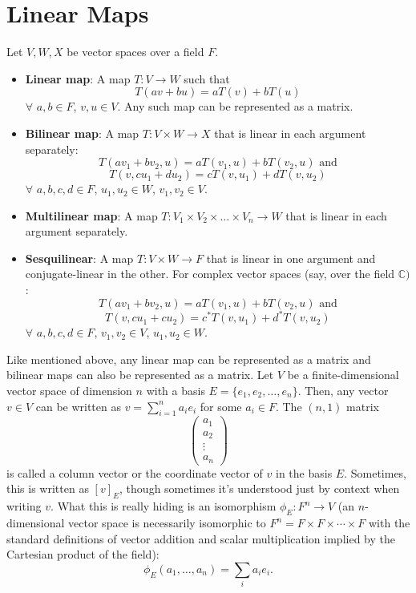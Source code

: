 \section{Linear Maps}
Let $V, W, X$ be vector spaces over a field $F$.
\begin{itemize}
    \item \textbf{Linear map}: A map $T: V\rightarrow W$ such that 
    \[
        T(av + bu) = aT(v) + bT(u)
    \]
    $\forall$ $a, b\in F$, $v, u\in V$. Any such map can be represented as a matrix.
    \item \textbf{Bilinear map}: A map $T: V\times W\rightarrow X$ that is linear in each argument separately:
    \[
        T(av_1 + bv_2, u) = aT(v_1, u) + bT(v_2, u) \text{ and}
    \]
    \[
        T(v, cu_1+du_2) = cT(v, u_1) + dT(v, u_2)
    \]
    $\forall$ $a, b, c, d\in F$, $u_1, u_2\in W$, $v_1, v_2\in V$.
    \item\textbf{Multilinear map}: A map $T: V_1\times V_2\times \dots \times V_n\rightarrow W$ that is linear in each argument separately.
    \item\textbf{Sesquilinear}: A map $T: V\times W\rightarrow F$ that is linear in one argument and conjugate-linear in the other. For complex vector spaces (say, over the field $\mathbb{C})$:
    \[
        T(av_1+bv_2, u) = aT(v_1, u) + bT(v_2, u) \text{ and}
    \]
    \[
        T(v, cu_1+cu_2) = c^*T(v, u_1) + d^*T(v, u_2) 
    \]
    $\forall$ $a, b, c, d\in F$, $v_1, v_2\in V$, $u_1, u_2\in W$.
\end{itemize}
Like mentioned above, any linear map can be represented as a matrix and bilinear maps can also be represented as a matrix. Let $V$ be a finite-dimensional vector space of dimension $n$ with a basis $E=\{e_1, e_2, \dots, e_n\}$. Then, any vector $v\in V$ can be written as $v=\sum_{i=1}^n a_i e_i$ for some $a_i\in F$. The $(n, 1)$ matrix
\[
    \begin{pmatrix}
        a_1 \\
        a_2 \\
        \vdots \\
        a_n
    \end{pmatrix}
\]
is called a column vector or the coordinate vector of $v$ in the basis $E$. Sometimes, this is written as $[v]_E$, though sometimes it's understood just by context when writing $v$. What this is really hiding is an isomorphism $\phi_E: F^n\rightarrow V$ (an $n$-dimensional vector space is necessarily isomorphic to $F^n=F\times F\times\cdots\times F$ with the standard definitions of vector addition and scalar multiplication implied by the Cartesian product of the field): 
\[
    \phi_E(a_1, \dots, a_n) = \sum_i a_i e_i.
\]


